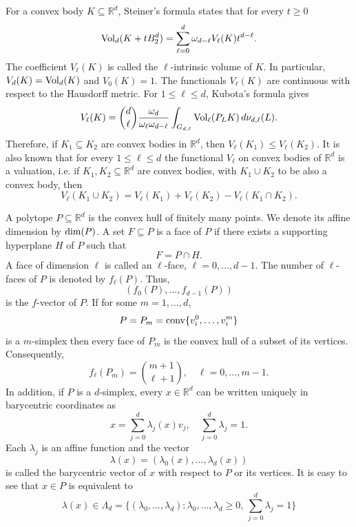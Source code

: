\documentclass[10pt]{amsart}
\newcommand{\1}{\textbf{1}}
\newcommand{\conv}{{\rm conv}}
\newcommand{\vol}{{\rm Vol}}
\numberwithin{equation}{section} %
\theoremstyle{remark}
\theoremstyle{definition}
\begin{document}
For a convex body $K \subseteq \mathbb{R}^d$, Steiner's formula states that for every $t \geq 0$ \[\vol_d(K+tB_2^d)=\sum_{\ell=0}^{d}\omega_{d-\ell} V_\ell(K)t^{d-\ell}.\] The coefficient $V_\ell(K)$ is called the $\ell$-intrinsic volume of $K$. In particular, $V_d(K)=\vol_d(K)$ and $V_0(K)=1$. The functionals $V_\ell(K)$ are continuous with respect to the Hausdorff metric. For $1 \leq \ell \leq d$, Kubota's formula gives 
\begin{equation}\label{eq:intrinsic-kubota-formula}  
V_\ell(K)=\binom{d}{\ell} \frac{\omega_d}{\omega_\ell \omega_{d-\ell}}\int_{G_{d,\ell}} \vol_\ell(P_LK) \, d\nu_{d,\ell}(L).
\end{equation}
Therefore, if $K_1 \subseteq K_2$ are convex bodies in $\mathbb{R}^d$, then $V_\ell(K_1) \leq V_\ell(K_2)$. It is also known that for every $1 \leq \ell \leq d$ the functional $V_\ell$ on convex bodies of $\mathbb{R}^d$ is a valuation, i.e. if $K_1, K_2 \subseteq \mathbb{R}^d$ are convex bodies, with $K_1 \cup K_2$ to be also a convex body, then \begin{equation}\label{eq:intrinsic-valuation}
    V_\ell(K_1 \cup K_2) =V_\ell(K_1)+V_\ell(K_2)-V_\ell (K_1 \cap K_2).
\end{equation}

A polytope $P \subseteq \mathbb{R}^d$ is the convex hull of finitely many points. We denote its affine dimension by ${\rm dim}(P)$. A set $F \subseteq P $ is a face of $P$ if there exists a supporting hyperplane $H$ of $P$ such that \[F=P \cap H.\] A face of dimension $\ell$ is called an $\ell$-face, $\ell=0,\ldots,d-1$. The number of $\ell$-faces of $P$ is denoted by $f_\ell(P)$. Thus, \[(f_0(P),\ldots,f_{d-1}(P))\] is the $f$-vector of $P$. If for some $m=1,\ldots,d$, \[P=P_m=\conv\{v_i^0,\ldots,v_i^m\}\] is a $m$-simplex then every face of $P_m$ is the convex hull of a subset of its vertices. Consequently, \begin{equation}\label{eq:m-simplex-faces}
    f_\ell(P_m)=\binom{m+1}{\ell+1}, \quad \ell=0,\ldots,m-1.
\end{equation}
In addition, if $P$ is a $d$-simplex, every $x \in \mathbb{R}^d$ can be written uniquely in barycentric coordinates as \[x=\sum_{j=0}^{d}\lambda_j(x)v_j, \quad \sum_{j=0}^d\lambda_j=1.\] Each $\lambda_j$ is an affine function and the vector \[\lambda(x)=(\lambda_0(x),\ldots,\lambda_d(x))\] is called the barycentric vector of $x$ with respect to $P$ or its vertices. It is easy to see that $x \in P$ is equivalent to \[\lambda(x)\in \Lambda_d=\{(\lambda_0,\ldots,\lambda_d):\lambda_0,\ldots,\lambda_d \geq 0, \, \sum_{j=0}^{d} \lambda_j =1\}  \]
\end{document}
